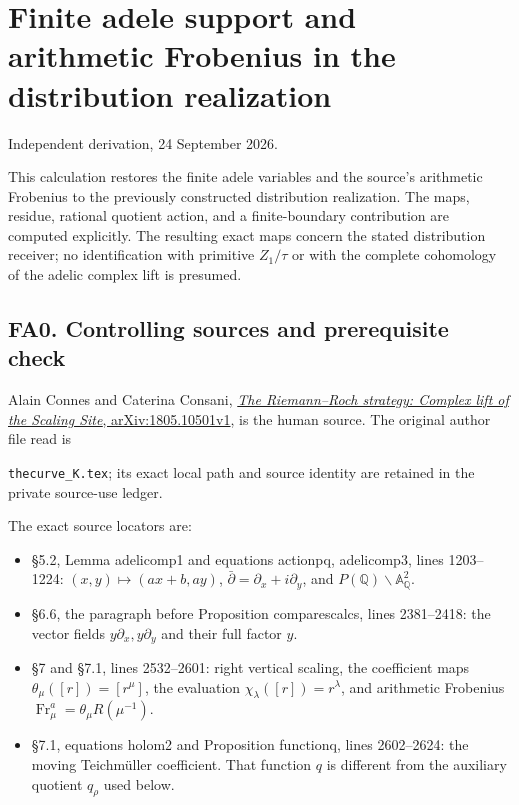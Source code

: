 \section{Finite adele support and arithmetic Frobenius in the
distribution
realization}\label{finite-adele-support-and-arithmetic-frobenius-in-the-distribution-realization}

Independent derivation, 24 September 2026.

This calculation restores the finite adele variables and the source's
arithmetic Frobenius to the previously constructed distribution
realization. The maps, residue, rational quotient action, and a
finite-boundary contribution are computed explicitly. The resulting
exact maps concern the stated distribution receiver; no identification
with primitive \(Z_1/\tau\) or with the complete cohomology of the
adelic complex lift is presumed.

\subsection{FA0. Controlling sources and prerequisite
check}\label{fa0.-controlling-sources-and-prerequisite-check}

Alain Connes and Caterina Consani,
\href{https://arxiv.org/abs/1805.10501v1}{\emph{The Riemann--Roch
strategy: Complex lift of the Scaling Site}, arXiv:1805.10501v1}, is the
human source. The original author file read is

\nolinkurl{thecurve_K.tex}; its exact local path and source identity are
retained in the private source-use ledger.

The exact source locators are:

\begin{itemize}
\tightlist
\item
  §5.2, Lemma adelicomp1 and equations actionpq, adelicomp3, lines
  1203--1224: \((x,y)\mapsto(ax+b,ay)\),
  \(\bar\partial=\partial_x+i\partial_y\), and
  \(P(\mathbb Q)\backslash\mathbb A_{\mathbb Q}^2\).
\item
  §6.6, the paragraph before Proposition comparescalcs, lines
  2381--2418: the vector fields \(y\partial_x,y\partial_y\) and their
  full factor \(y\).
\item
  §7 and §7.1, lines 2532--2601: right vertical scaling, the coefficient
  maps \(\theta_\mu([r])=[r^\mu]\), the evaluation
  \(\chi_\lambda([r])=r^\lambda\), and arithmetic Frobenius
  \(\operatorname{Fr}^a_\mu=\theta_\mu R(\mu^{-1})\).
\item
  §7.1, equations holom2 and Proposition functionq, lines 2602--2624:
  the moving Teichmüller coefficient. That function \(q\) is different
  from the auxiliary quotient \(q_\rho\) used below.
\end{itemize}

